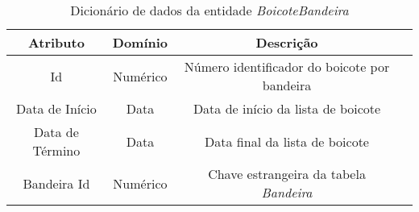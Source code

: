 \begin{table}[H]
\centering
\caption{Dicionário de dados da entidade \textit{BoicoteBandeira}}
\label{dic:flag_boycott}
\begin{tabular}{|c|c|c|c|}\hline
\textbf{Atributo} & \textbf{Domínio}  & \textbf{Descrição}   \\ \hline
Id                            & Numérico                                                       & Número identificador do boicote por bandeira \\ \hline
Data de Início                      & Data                                           & Data de início da lista de boicote \\ \hline
Data de Término                       & Data                                         & Data final da lista de boicote\\ \hline
Bandeira Id & Numérico & Chave estrangeira da tabela \textit{Bandeira}\\ \hline

\end{tabular}
\end{table}
